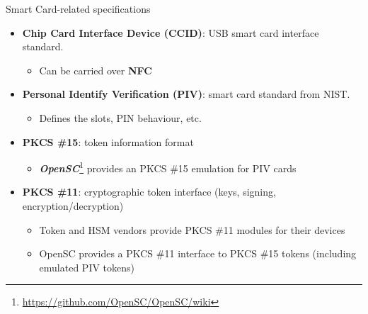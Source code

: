 \documentclass[ignorenonframetext,aspectratio=169,12pt]{beamer}
\begin{document}
\begin{frame}{Smart Card-related specifications}
\protect\hypertarget{smart-card-standards}{}

\begin{itemize}
    \item {\bf Chip Card Interface Device (CCID)}: USB smart card
        interface standard.
        \begin{itemize}
            \item Can be carried over {\bf NFC}
        \end{itemize}

    \item {\bf Personal Identify Verification (PIV)}: smart card
        standard from NIST.
        \begin{itemize}
            \item Defines the slots, PIN behaviour, etc.
        \end{itemize}

    \item {\bf PKCS \#15}: token information format
        \begin{itemize}
            \item \textbf{\emph{OpenSC}}\footnote{\url{https://github.com/OpenSC/OpenSC/wiki}}
                provides an PKCS \#15 emulation for PIV cards
        \end{itemize}

    \item {\bf PKCS \#11}: cryptographic token interface (keys,
        signing, encryption/decryption)
        \begin{itemize}
            \item Token and HSM vendors provide PKCS \#11 modules for their devices
            \item OpenSC provides a PKCS \#11 interface to PKCS \#15 tokens (including emulated PIV tokens)
        \end{itemize}

\end{itemize}
\end{frame}
\end{document}
